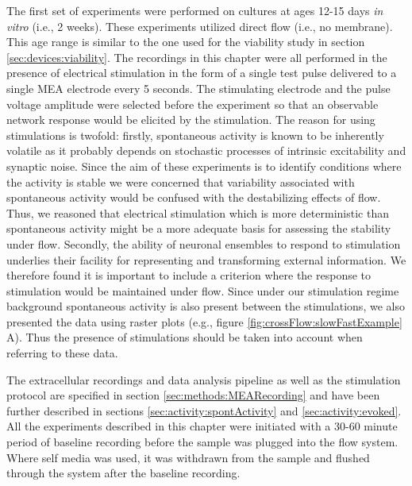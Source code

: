         The first set of experiments were performed on cultures at ages 12-15 days \textit{in vitro} (i.e., 2 weeks). These experiments utilized direct flow (i.e., no membrane). This age range is similar to the one used for the viability study in section \ref{sec:devices:viability}. The recordings in this chapter were all performed in the presence of electrical stimulation in the form of a single test pulse delivered to a single MEA electrode every 5 seconds. The stimulating electrode and the pulse voltage amplitude were selected before the experiment so that an observable network response would be elicited by the stimulation. The reason for using stimulations is twofold: firstly, spontaneous activity is known to be inherently volatile as it probably depends on stochastic processes of intrinsic excitability and synaptic noise. Since the aim of these experiments is to identify conditions where the activity is stable we were concerned that variability associated with spontaneous activity would be confused with the destabilizing effects of flow. Thus, we reasoned that electrical stimulation which is more deterministic than spontaneous activity might be a more adequate basis for assessing the stability under flow. Secondly, the ability of neuronal ensembles to respond to stimulation underlies their facility for representing and transforming external information. We therefore found it is important to include a criterion where the response to stimulation would be maintained under flow. Since under our stimulation regime background spontaneous activity is also present between the stimulations, we also presented the data using raster plots (e.g., figure \ref{fig:crossFlow:slowFastExample} A). Thus the presence of stimulations should be taken into account when referring to these data.

        The extracellular recordings and data analysis pipeline as well as the stimulation protocol are specified in section \ref{sec:methods:MEARecording} and have been further described in sections \ref{sec:activity:spontActivity} and \ref{sec:activity:evoked}. All the experiments described in this chapter were initiated with a 30-60 minute period of baseline recording before the sample was plugged into the flow system. Where self media was used, it was withdrawn from the sample and flushed through the system after the baseline recording.

